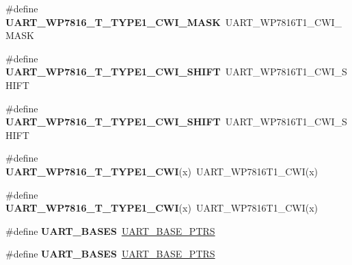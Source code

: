 \begin{DoxyCompactItemize}
\item 
\#define {\bfseries U\+A\+R\+T\+\_\+\+W\+P7816\+\_\+\+T\+\_\+\+T\+Y\+P\+E1\+\_\+\+C\+W\+I\+\_\+\+M\+A\+SK}~U\+A\+R\+T\+\_\+\+W\+P7816\+T1\+\_\+\+C\+W\+I\+\_\+\+M\+A\+SK\hypertarget{group__Backward__Compatibility__Symbols_gac187226c5d0a1c13888f04cb6fd837b1}{}\label{group__Backward__Compatibility__Symbols_gac187226c5d0a1c13888f04cb6fd837b1}

\item 
\#define {\bfseries U\+A\+R\+T\+\_\+\+W\+P7816\+\_\+\+T\+\_\+\+T\+Y\+P\+E1\+\_\+\+C\+W\+I\+\_\+\+S\+H\+I\+FT}~U\+A\+R\+T\+\_\+\+W\+P7816\+T1\+\_\+\+C\+W\+I\+\_\+\+S\+H\+I\+FT\hypertarget{group__Backward__Compatibility__Symbols_gad9cb85843e4cabc17e896f27901df941}{}\label{group__Backward__Compatibility__Symbols_gad9cb85843e4cabc17e896f27901df941}

\item 
\#define {\bfseries U\+A\+R\+T\+\_\+\+W\+P7816\+\_\+\+T\+\_\+\+T\+Y\+P\+E1\+\_\+\+C\+W\+I\+\_\+\+S\+H\+I\+FT}~U\+A\+R\+T\+\_\+\+W\+P7816\+T1\+\_\+\+C\+W\+I\+\_\+\+S\+H\+I\+FT\hypertarget{group__Backward__Compatibility__Symbols_gad9cb85843e4cabc17e896f27901df941}{}\label{group__Backward__Compatibility__Symbols_gad9cb85843e4cabc17e896f27901df941}

\item 
\#define {\bfseries U\+A\+R\+T\+\_\+\+W\+P7816\+\_\+\+T\+\_\+\+T\+Y\+P\+E1\+\_\+\+C\+WI}(x)~U\+A\+R\+T\+\_\+\+W\+P7816\+T1\+\_\+\+C\+WI(x)\hypertarget{group__Backward__Compatibility__Symbols_ga5326ca16b01f2260770c19cedaef87eb}{}\label{group__Backward__Compatibility__Symbols_ga5326ca16b01f2260770c19cedaef87eb}

\item 
\#define {\bfseries U\+A\+R\+T\+\_\+\+W\+P7816\+\_\+\+T\+\_\+\+T\+Y\+P\+E1\+\_\+\+C\+WI}(x)~U\+A\+R\+T\+\_\+\+W\+P7816\+T1\+\_\+\+C\+WI(x)\hypertarget{group__Backward__Compatibility__Symbols_ga5326ca16b01f2260770c19cedaef87eb}{}\label{group__Backward__Compatibility__Symbols_ga5326ca16b01f2260770c19cedaef87eb}

\item 
\#define {\bfseries U\+A\+R\+T\+\_\+\+B\+A\+S\+ES}~\hyperlink{group__UART__Peripheral__Access__Layer_ga7b34a38b9492a1e1007b2f66383aef17}{U\+A\+R\+T\+\_\+\+B\+A\+S\+E\+\_\+\+P\+T\+RS}\hypertarget{group__Backward__Compatibility__Symbols_ga96431c7046bbe06c387d7c8452f7f86d}{}\label{group__Backward__Compatibility__Symbols_ga96431c7046bbe06c387d7c8452f7f86d}

\item 
\#define {\bfseries U\+A\+R\+T\+\_\+\+B\+A\+S\+ES}~\hyperlink{group__UART__Peripheral__Access__Layer_ga7b34a38b9492a1e1007b2f66383aef17}{U\+A\+R\+T\+\_\+\+B\+A\+S\+E\+\_\+\+P\+T\+RS}\hypertarget{group__Backward__Compatibility__Symbols_ga96431c7046bbe06c387d7c8452f7f86d}{}\label{group__Backward__Compatibility__Symbols_ga96431c7046bbe06c387d7c8452f7f86d}


\end{DoxyCompactItemize}
